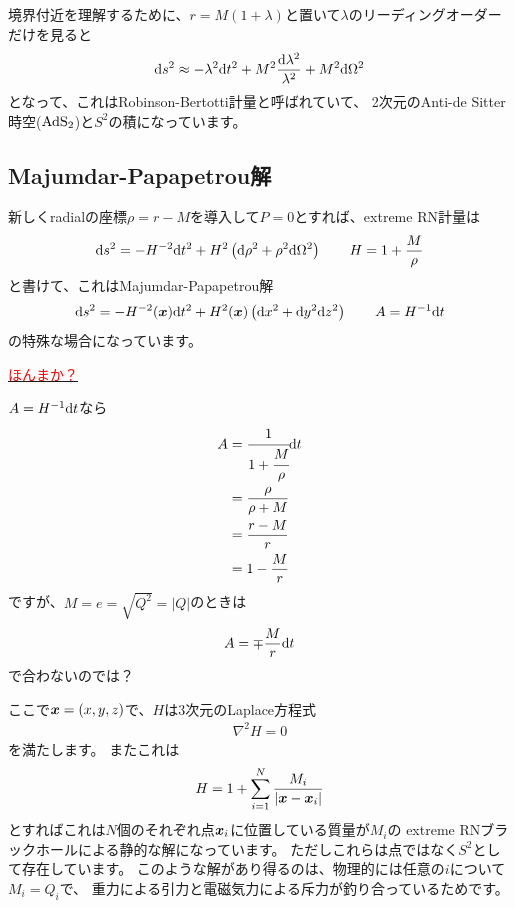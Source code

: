 \documentclass[a4paper, 12pt]{jsarticle}
\theoremstyle{definition}
\def\vec#1{\mbox{\boldmath $#1$}}
\newcommand{\ddif}{{\rm d}}
\begin{document}
境界付近を理解するために、$r = M(1 + \lambda)$と置いて$\lambda$のリーディングオーダー
だけを見ると
\begin{align}
	\ddif s^2 \approx -\lambda^2 \ddif t^2
	+ M^2 \frac{\ddif \lambda^2}{\lambda^2} + M^2 \ddif \Omega^2
\end{align}
となって、これはRobinson-Bertotti計量と呼ばれていて、
2次元のAnti-de Sitter時空(${\rm AdS}_2$)と$S^2$の積になっています。

\subsection{Majumdar-Papapetrou解}
新しくradialの座標$\rho = r - M$を導入して$P=0$とすれば、extreme RN計量は
\begin{align}
	\ddif s^2 = -H^{-2} \ddif t^2
	+ H^2 \left( \ddif \rho^2 + \rho^2 \ddif \Omega^2 \right)
	\qquad H = 1 + \frac{M}{\rho}
\end{align}
と書けて、これはMajumdar-Papapetrou解
\begin{align}
	\ddif s^2 = -H^{-2}(\vec{x}) \ddif t^2
	+ H^2(\vec{x}) \left( \ddif x^2 + \ddif y^2 \ddif z^2 \right)
	\qquad A = H^{-1} \ddif t
\end{align}
の特殊な場合になっています。
\begin{screen}
	\underline{\textcolor{red}{ほんまか？}}

	$A = H^{-1} \ddif t$なら
	\begin{align}
		A &= \cfrac{1}{1 + \cfrac{M}{\rho}} \ddif t \\
		&= \frac{\rho}{\rho + M} \\
		&= \frac{r - M}{r} \\
		&= 1 - \frac{M}{r}
	\end{align}
	ですが、$M = e = \sqrt{Q^2} = |Q|$のときは
	\begin{align}
		A = \mp \frac{M}{r} \ddif t
	\end{align}
	で合わないのでは？
\end{screen}
ここで$\vec{x} = (x, y, z)$で、$H$は3次元のLaplace方程式
\begin{align}
	\nabla^2 H = 0
\end{align}
を満たします。
またこれは
\begin{align}
	H = 1 + \sum_{i = 1}^N \frac{M_i}{\left| \vec{x} - \vec{x}_i \right|}
\end{align}
とすればこれは$N$個のそれぞれ点$\vec{x}_i$に位置している質量が$M_i$の
extreme RNブラックホールによる静的な解になっています。
ただしこれらは点ではなく$S^2$として存在しています。
このような解があり得るのは、物理的には任意の$i$について$M_i = Q_i$で、
重力による引力と電磁気力による斥力が釣り合っているためです。
\end{document}
